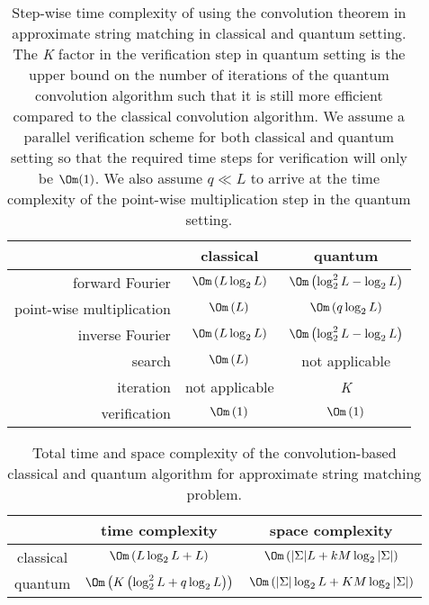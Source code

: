 \begin{table}[h!]
	\centering
	\begin{tabular}{| r || c | c |}
		\hline
		\quad                            & classical                                 & quantum\\
		\hline\hline
		forward Fourier              & $\Om\left( L\log_2 L \right)$ & $\Om\left( \log_2^2 L - \log_2 L \right)$\\
		\hline
		point-wise multiplication & $\Om\left( L \right)$             & $\Om\left( q\log_2 L \right)$\\
		\hline
		inverse Fourier               & $\Om\left( L\log_2 L \right)$ & $\Om\left( \log_2^2 L - \log_2 L \right)$\\
		\hline
		search                          & $\Om\left( L \right)$              & not applicable\\
		\hline
		iteration                        & not applicable                          & \textit{K}\\
		\hline
		verification                    & $\Om\left( 1 \right)$            & $\Om\left( 1 \right)$\\
		\hline
	\end{tabular}
	\caption{Step-wise time complexity of using the convolution theorem in approximate string matching in classical and quantum setting. The \textit{K} factor in the verification step in quantum setting is the upper bound on the number of iterations of the quantum convolution algorithm such that it is still more efficient compared to the classical convolution algorithm. We assume a parallel verification scheme for both classical and quantum setting so that the required time steps for verification will only be $\Om(1)$. We also assume $q \ll L$ to arrive at the time complexity of the point-wise multiplication step in the quantum setting.}
	\label{tab:time-complexity-convolution}
\end{table}

\begin{table}[h!]
	\centering
	\begin{tabular}{ | c || c | c |}
		\hline
		\quad         & time complexity                                                                         & space complexity\\
		\hline\hline
		classical      & $\Om\left(L\log_2 L + L\right)$                                        & $\Om\left( \vert \Sigma \vert L  + kM \log_2 \vert \Sigma \vert \right)$\\
		\hline
		quantum     & $\Om\left( K\left(\log_2^2 L + q\log_2 L \right) \right)$  & $\Om\left( \vert \Sigma \vert\log_2 L + KM \log_2 \vert \Sigma \vert \right)$\\
		\hline
	\end{tabular}
	\caption{Total time and space complexity of the convolution-based classical and quantum algorithm for approximate string matching problem.}
	\label{tab:total-complexity-convolution}
\end{table}

